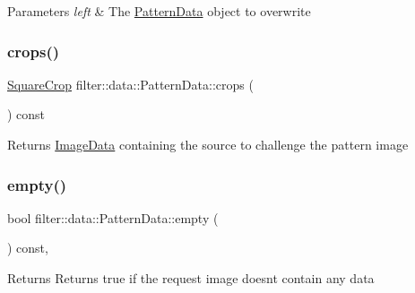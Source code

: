 \begin{DoxyParams}{Parameters}
{\em left} & The \hyperlink{classfilter_1_1data_1_1_pattern_data}{Pattern\+Data} object to overwrite \\
\hline
\end{DoxyParams}
\mbox{\label{classfilter_1_1data_1_1_pattern_data_af4d2493ea93e969aa63851124457e3ea}} 
\subsubsection{\texorpdfstring{crops()}{crops()}}
{\footnotesize\ttfamily \hyperlink{classfilter_1_1data_1_1_square_crop}{Square\+Crop} filter\+::data\+::\+Pattern\+Data\+::crops (\begin{DoxyParamCaption}{ }\end{DoxyParamCaption}) const\hspace{0.3cm}{\ttfamily [inline]}}

\begin{DoxyReturn}{Returns}
\hyperlink{classfilter_1_1data_1_1_image_data}{Image\+Data} containing the source to challenge the pattern image 
\end{DoxyReturn}
\mbox{\label{classfilter_1_1data_1_1_pattern_data_a333d7ffa45e6a041e10e2f957c91dbbf}} 
\subsubsection{\texorpdfstring{empty()}{empty()}}
{\footnotesize\ttfamily bool filter\+::data\+::\+Pattern\+Data\+::empty (\begin{DoxyParamCaption}{ }\end{DoxyParamCaption}) const\hspace{0.3cm}{\ttfamily [inline]}, {\ttfamily [virtual]}}

\begin{DoxyReturn}{Returns}
Returns true if the request image doesn\textquotesingle{}t contain any data 
\end{DoxyReturn}


